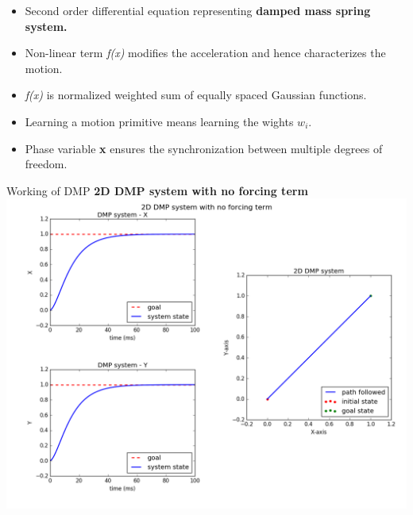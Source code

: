 \documentclass{beamer}
\begin{document}
	
	\begin{frame}
		\begin{itemize}
			\item Second order differential equation representing \textbf{damped mass spring system.} 
			\item Non-linear term \color{red} \textit{f(x)} \color{black} modifies the acceleration and hence characterizes the motion. 
			\item \color{red} \textit{f(x)} \color{black} is normalized weighted sum of equally spaced Gaussian functions. 
			\item Learning a motion primitive means learning the wights 	\textbf{\textit{$w_{i}$}}.
			\item Phase variable \textbf{x} ensures the synchronization between multiple degrees of freedom.  
		\end{itemize}
	\end{frame}

	\begin{frame}{Working of DMP}
		\centering
		\textbf{2D DMP system with no forcing term}
		\includegraphics[scale=0.3]{images/dmp_no_f}
	\end{frame}
	
\end{document}

